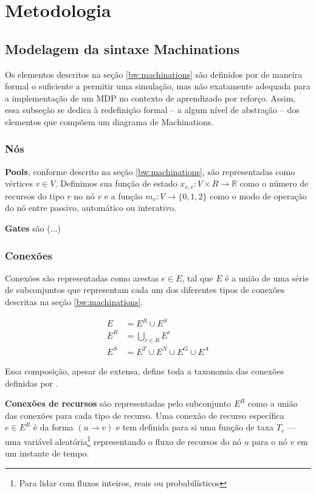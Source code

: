 \documentclass[10pt,a4paper]{article}
\begin{document}
\section{Metodologia}
\label{m}

\subsection{Modelagem da sintaxe Machinations}
\label{m:modeling}
Os elementos descritos na seção \ref{bw:machinations} são definidos por \citeauthor{machinations} de maneira formal o suficiente a permitir uma simulação, mas não exatamente adequada para a implementação de um MDP no contexto de aprendizado por reforço. Assim, essa subseção se dedica à redefinição formal -- a algum nível de abstração -- dos elementos que compõem um diagrama de Machinations.

\subsubsection{Nós}
\textbf{Pools}, conforme descrito na seção \ref{bw:machinations}, são representadas como vértices $v \in V$. Definimos sua função de estado $x_{v,r}: V \times R \rightarrow \mathbb{R}$ como o número de recursos do tipo $r$ no nó $v$ e a função $m_{v}: V \rightarrow \{0,1,2\}$ como o modo de operação do nó entre passivo, automático ou interativo.

\textbf{Gates} são (...)

\subsubsection{Conexões}
Conexões são representadas como arestas $e \in E$, tal que $E$ é a união de uma série de subconjuntos que representam cada um dos diferentes tipos de conexões descritas na seção \ref{bw:machinations}.

\begin{align*}
    E &= E^R \cup E^S\\
    E^R &= \bigcup_{r \in R} E^r\\
    E^S &= E^{T} \cup E^{N} \cup E^{G} \cup E^{A}
\end{align*}

Essa composição, apesar de extensa, define toda a taxonomia das conexões definidas por \citeauthor{machinations}.

\textbf{Conexões de recursos} são representadas pelo subconjunto $E^R$ como a união das conexões para cada tipo de recurso. Uma conexão de recurso específica $e \in E^R$ é da forma $(u \rightarrow v)$ e tem definida para si uma função de taxa $T_e$ --- uma variável aleatória\footnote{Para lidar com fluxos inteiros, reais ou probabilísticos} representando o fluxo de recursos do nó $u$ para o nó $v$ em um instante de tempo.
\end{document}
